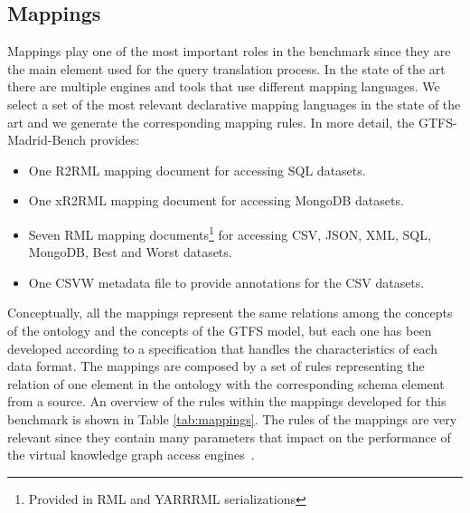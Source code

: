 \subsection{Mappings} 
Mappings play one of the most important roles in the benchmark since they are the main element used for the query translation process. In the state of the art there are multiple engines and tools that use different mapping languages. We select a set of the most relevant declarative mapping languages in the state of the art and we generate the corresponding mapping rules. In more detail, the GTFS-Madrid-Bench provides:
\begin{itemize}
    \item One R2RML mapping document for accessing SQL datasets.
    \item One xR2RML mapping document for accessing MongoDB datasets.
    \item Seven RML mapping documents\footnote{Provided in RML and YARRRML serializations} for accessing CSV, JSON, XML, SQL, MongoDB, Best and Worst datasets.
    \item One CSVW metadata file to provide annotations for the CSV datasets.
\end{itemize}
Conceptually, all the mappings represent the same relations among the concepts of the ontology and the concepts of the GTFS model, but each one has been developed according to a specification that handles the characteristics of each data format. The mappings are composed by a set of rules representing the relation of one element in the ontology with the corresponding schema element from a source. An overview of the rules within the mappings developed for this benchmark is shown in Table \ref{tab:mappings}. The rules of the mappings are very relevant since they contain many parameters that impact on the performance of the virtual knowledge graph access engines~\citep{chaves2019what}. 

